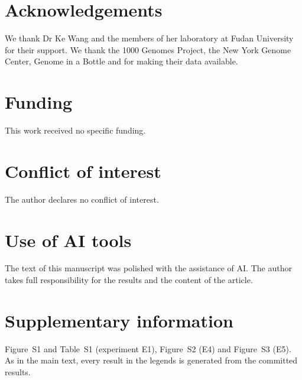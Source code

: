 \documentclass[11pt]{article}
\begin{document}
\section*{Acknowledgements}
We thank Dr Ke Wang and the members of her laboratory at Fudan University for their support. We thank the 1000 Genomes Project, the New York Genome Center, Genome in a Bottle and \citet{hilgers2025} for making their data available.

\section*{Funding}
This work received no specific funding.

\section*{Conflict of interest}
The author declares no conflict of interest.

\section*{Use of AI tools}
The text of this manuscript was polished with the assistance of AI. The author takes full responsibility for the results and the content of the article.

\singlespacing  %



\clearpage
\nolinenumbers
\setcounter{figure}{0}\setcounter{table}{0}
\renewcommand{\thefigure}{S\arabic{figure}}\renewcommand{\theHfigure}{S\arabic{figure}}
\renewcommand{\thetable}{S\arabic{table}}\renewcommand{\theHtable}{S\arabic{table}}
\section*{Supplementary information}
\noindent Figure~S1 and Table~S1 (experiment E1), Figure~S2 (E4) and Figure~S3 (E5). As in the main text, every result in the legends is generated from the committed results.

\newcommand{\suppmethods}{Methods}  %

\end{document}
